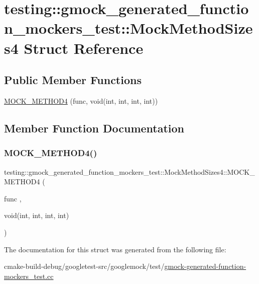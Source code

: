 \hypertarget{structtesting_1_1gmock__generated__function__mockers__test_1_1MockMethodSizes4}{}\section{testing\+::gmock\+\_\+generated\+\_\+function\+\_\+mockers\+\_\+test\+::Mock\+Method\+Sizes4 Struct Reference}
\label{structtesting_1_1gmock__generated__function__mockers__test_1_1MockMethodSizes4}
\subsection*{Public Member Functions}
\begin{DoxyCompactItemize}
\item 
\mbox{\hyperlink{structtesting_1_1gmock__generated__function__mockers__test_1_1MockMethodSizes4_a140f1bc5124d32b763913f5f64fe3502}{M\+O\+C\+K\+\_\+\+M\+E\+T\+H\+O\+D4}} (func, void(int, int, int, int))
\end{DoxyCompactItemize}


\subsection{Member Function Documentation}
\mbox{\label{structtesting_1_1gmock__generated__function__mockers__test_1_1MockMethodSizes4_a140f1bc5124d32b763913f5f64fe3502}} 
\subsubsection{\texorpdfstring{MOCK\_METHOD4()}{MOCK\_METHOD4()}}
{\footnotesize\ttfamily testing\+::gmock\+\_\+generated\+\_\+function\+\_\+mockers\+\_\+test\+::\+Mock\+Method\+Sizes4\+::\+M\+O\+C\+K\+\_\+\+M\+E\+T\+H\+O\+D4 (\begin{DoxyParamCaption}\item[{func}]{,  }\item[{void(int, int, int, int)}]{ }\end{DoxyParamCaption})}



The documentation for this struct was generated from the following file\+:\begin{DoxyCompactItemize}
\item 
cmake-\/build-\/debug/googletest-\/src/googlemock/test/\mbox{\hyperlink{gmock-generated-function-mockers__test_8cc}{gmock-\/generated-\/function-\/mockers\+\_\+test.\+cc}}\end{DoxyCompactItemize}
